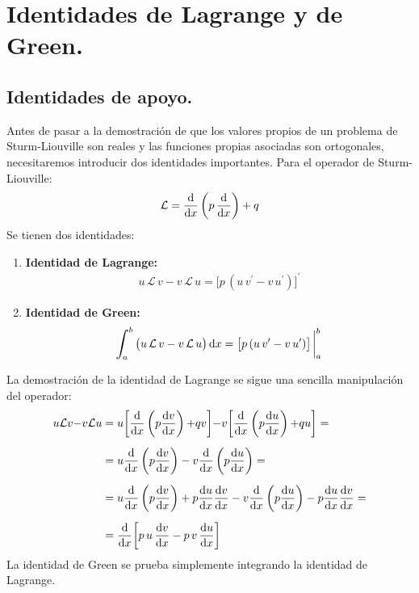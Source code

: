 \documentclass[12pt]{article}
\newcommand{\pderivada}[1]{\ensuremath{{#1}^{\prime}}}
\def\scaleint#1{\vcenter{\hbox{\scaleto[3ex]{\displaystyle\int}{#1}}}}
\def\bs{\mkern-12mu}
\numberwithin{equation}{section}
\begin{document}
\section{Identidades de Lagrange y de Green.}
\subsection{Identidades de apoyo.}

Antes de pasar a la demostración de que los valores propios de un problema de Sturm-Liouville son reales y las funciones propias asociadas son ortogonales,  necesitaremos introducir dos identidades importantes. Para el operador de Sturm-Liouville:
\begin{align*}
\mathcal{L} = \dv{x} \left( p \, \dv{x} \right) + q
\end{align*}
Se tienen dos identidades:
\begin{enumerate}
\item \textbf{Identidad de Lagrange:} 
\begin{align*}
u \, \mathcal{L} \, v - v \, \mathcal{L} \, u = \big[ p \, (u \, \pderivada{v} - v \, \pderivada{u}) \big]^{\prime}
\end{align*}
\item \textbf{Identidad de Green:} 
\begin{align*}
\scaleint{6ex}_{\bs a}^{b} \, \big(u \, \mathcal{L} \, v - v \, \mathcal{L} \, u \big) \dd{x} = \big[ p \, (u \, \pderivada{v} - v \, \pderivada{u}) \big]\eval_{a}^{b}
\end{align*}
\end{enumerate}

La demostración de la identidad de Lagrange se sigue una sencilla manipulación del operador:
\begin{eqnarray}
\begin{aligned}[b]
u  \mathcal{L} v {-} v \mathcal{L} u &= u \bigg[ \dv{x} \left( p \dv{v}{x} \right) {+} q v \bigg] {-} v \bigg[ \dv{x} \left( p \dv{u}{x} \right) {+} q u \bigg] = \\[0.5em] 
&= u \dv{x} \left( p \dv{v}{x} \right) - v \dv{x} \left( p \dv{u}{x} \right) = \\[0.5em]
&= u \dv{x} \left( p \dv{v}{x} \right) + p \dv{u}{x} \dv{v}{x} - v \dv{x} \left( p \dv{u}{x} \right) - p \dv{u}{x} \dv{v}{x} = \\[0.5em] 
&= \dv{x} \bigg[ p \, u \, \dv{v}{x} - p \, v \, \dv{u}{x}  \bigg]
\end{aligned}
\label{eq:ecuacion_04_21}
\end{eqnarray}
La identidad de Green se prueba simplemente integrando la identidad de Lagrange.
    
\end{document}
